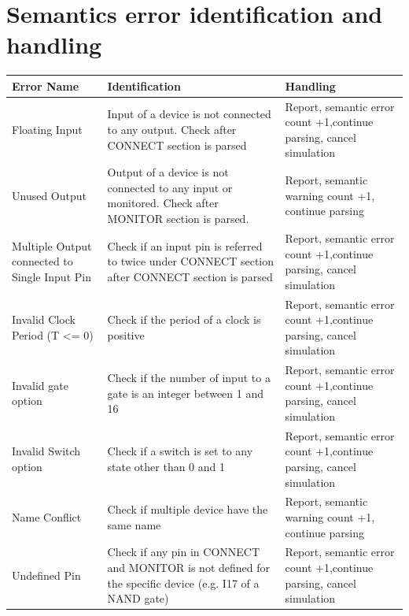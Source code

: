 \documentclass[12pt]{article}
\begin{document}
\section{Semantics error identification and handling}
\begin{center}
	\begin{tabular}{|m{3cm} | m{6cm} | m{8cm} |}
		\hline
		Error Name & Identification & Handling \\
		\hline
		Floating Input & Input of a device is not connected to any output. Check after CONNECT section is parsed & Report, semantic error count +1,continue parsing,  cancel simulation \\
		\hline
		Unused Output & Output of a device is not connected to any input or monitored. Check after MONITOR section is parsed. & Report, semantic warning count +1, continue parsing \\
		\hline
		Multiple Output connected to Single Input Pin & Check if an input pin is referred to twice under CONNECT section after CONNECT section is parsed & Report, semantic error count +1,continue parsing,  cancel simulation \\
		\hline
		Invalid Clock Period (T <= 0) & Check if the period of a clock is positive & Report, semantic error count +1,continue parsing,  cancel simulation \\
		\hline
		Invalid gate option & Check if the number of input to a gate is an integer between 1 and 16 & Report, semantic error count +1,continue parsing,  cancel simulation \\
		\hline
		Invalid Switch option & Check if a switch is set to any state other than 0 and 1 & Report, semantic error count +1,continue parsing,  cancel simulation \\
		\hline
		Name Conflict & Check if multiple device have the same name & Report, semantic warning count +1, continue parsing \\
		\hline
		Undefined Pin & Check if any pin in CONNECT and MONITOR is not defined for the specific device (e.g. I17 of a NAND gate) & Report, semantic error count +1,continue parsing,  cancel simulation \\
		\hline
		
		
		
		
		
	\end{tabular}
\end{center}
\newpage
\end{document}
